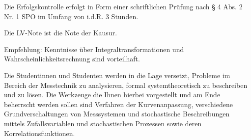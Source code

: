 \begin{course}

\setdoclanguagegerman
{}



\coursehead


\label{cour_7997.dp_997}


\begin{styleenv}
\begin{assessment}
Die Erfolgskontrolle erfolgt in Form einer schriftlichen Prüfung nach § 4 Abs. 2 Nr. 1 SPO im Umfang von i.d.R. 3 Stunden.

 

Die LV-Note ist die Note der Kausur.


\end{assessment}

\begin{conditions}Empfehlung: Kenntnisse über Integraltransformationen und Wahrscheinlichkeitsrechnung sind vorteilhaft.

\end{conditions}


\end{styleenv}

\begin{learningoutcomes}
Die Studentinnen und Studenten werden in die Lage versetzt, Probleme im Bereich der Messtechnik zu analysieren, formal systemtheoretisch zu beschreiben und zu lösen. Die Werkzeuge die Ihnen hierbei vorgestellt und am Ende beherrscht werden sollen sind Verfahren der Kurvenanpassung, verschiedene Grundverschaltungen von Messsystemen und stochastische Beschreibungen mittels Zufallsvariablen und stochastischen Prozessen sowie deren Korrelationsfunktionen.


\end{learningoutcomes}


\end{course}
